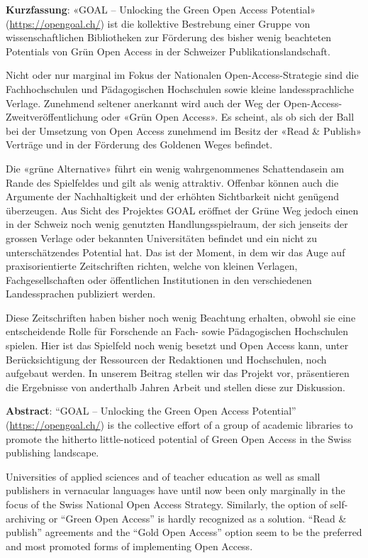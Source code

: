 \textbf{Kurzfassung}: «GOAL -- Unlocking the Green Open Access
Potential» (\href{https://opengoal.ch/}{https://opengoal.ch/}) ist die kollektive Bestrebung
einer Gruppe von wissenschaftlichen Bibliotheken zur Förderung des
bisher wenig beachteten Potentials von Grün Open Access in der Schweizer
Publikationslandschaft.

Nicht oder nur marginal im Fokus der Nationalen
Open-Access-Strategie sind die Fachhochschulen und Pädagogischen
Hochschulen sowie kleine landessprachliche Verlage. Zunehmend seltener
anerkannt wird auch der Weg der Open-Access-Zweitveröffentlichung oder
«Grün Open Access». Es scheint, als ob sich der Ball bei der Umsetzung
von Open Access zunehmend im Besitz der «Read \& Publish» Verträge und
in der Förderung des Goldenen Weges befindet. 

Die «grüne Alternative»
führt ein wenig wahrgenommenes Schattendasein am Rande des Spielfeldes
und gilt als wenig attraktiv. Offenbar können auch die Argumente der
Nachhaltigkeit und der erhöhten Sichtbarkeit nicht genügend überzeugen.
Aus Sicht des Projektes GOAL eröffnet der Grüne Weg jedoch einen in der
Schweiz noch wenig genutzten Handlungsspielraum, der sich jenseits der
grossen Verlage oder bekannten Universitäten befindet und ein nicht zu
unterschätzendes Potential hat. Das ist der Moment, in dem wir das Auge
auf praxisorientierte Zeitschriften richten, welche von kleinen
Verlagen, Fachgesellschaften oder öffentlichen Institutionen in den
verschiedenen Landessprachen publiziert werden. 

Diese Zeitschriften
haben bisher noch wenig Beachtung erhalten, obwohl sie eine
entscheidende Rolle für Forschende an Fach- sowie Pädagogischen
Hochschulen spielen. Hier ist das Spielfeld noch wenig besetzt und Open
Access kann, unter Berücksichtigung der Ressourcen der Redaktionen und
Hochschulen, noch aufgebaut werden. In unserem Beitrag stellen wir das
Projekt vor, präsentieren die Ergebnisse von anderthalb Jahren Arbeit
und stellen diese zur Diskussion.

\textbf{Abstract}: \enquote{GOAL -- Unlocking the Green Open Access Potential}
(\href{https://opengoal.ch/}{https://opengoal.ch/}) is the collective effort of a group of
academic libraries to promote the hitherto little-noticed potential of
Green Open Access in the Swiss publishing landscape. 

Universities of
applied sciences and of teacher education as well as small publishers in
vernacular languages have until now been only marginally in the focus of
the Swiss National Open Access Strategy. Similarly, the option of
self-archiving or \enquote{Green Open Access} is hardly recognized as a
solution. \enquote{Read \& publish} agreements and the \enquote{Gold Open Access}
option seem to be the preferred and most promoted forms of implementing
Open Access. 

